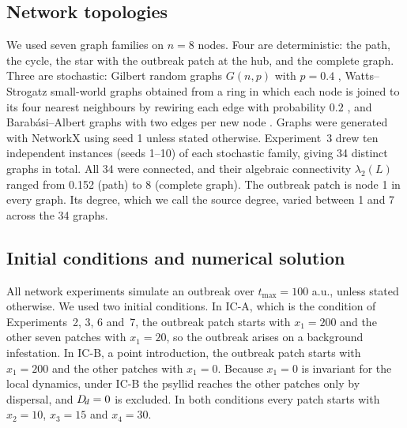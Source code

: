 \subsection{Network topologies}
\label{sec:topologies}

We used seven graph families on $n = 8$ nodes. Four are deterministic: the path, the cycle, the star with the outbreak patch at the hub, and the complete graph. Three are stochastic: Gilbert random graphs $G(n,p)$ with $p = 0.4$ \citep{gilbert1959}, Watts--Strogatz small-world graphs obtained from a ring in which each node is joined to its four nearest neighbours by rewiring each edge with probability $0.2$ \citep{watts1998}, and Barab\'asi--Albert graphs with two edges per new node \citep{barabasi1999}. Graphs were generated with NetworkX \citep{hagberg2008} using seed 1 unless stated otherwise. Experiment~3 drew ten independent instances (seeds 1--10) of each stochastic family, giving 34 distinct graphs in total. All 34 were connected, and their algebraic connectivity $\lambda_2(L)$ \citep{fiedler1973} ranged from 0.152 (path) to 8 (complete graph). The outbreak patch is node 1 in every graph. Its degree, which we call the source degree, varied between 1 and 7 across the 34 graphs.

\subsection{Initial conditions and numerical solution}
\label{sec:numerics}

All network experiments simulate an outbreak over $t_{\max} = 100$ a.u., unless stated otherwise. We used two initial conditions. In IC-A, which is the condition of Experiments~2, 3, 6 and~7, the outbreak patch starts with $x_1 = 200$ and the other seven patches with $x_1 = 20$, so the outbreak arises on a background infestation. In IC-B, a point introduction, the outbreak patch starts with $x_1 = 200$ and the other patches with $x_1 = 0$. Because $x_1 = 0$ is invariant for the local dynamics, under IC-B the psyllid reaches the other patches only by dispersal, and $D_{\!d} = 0$ is excluded. In both conditions every patch starts with $x_2 = 10$, $x_3 = 15$ and $x_4 = 30$.

